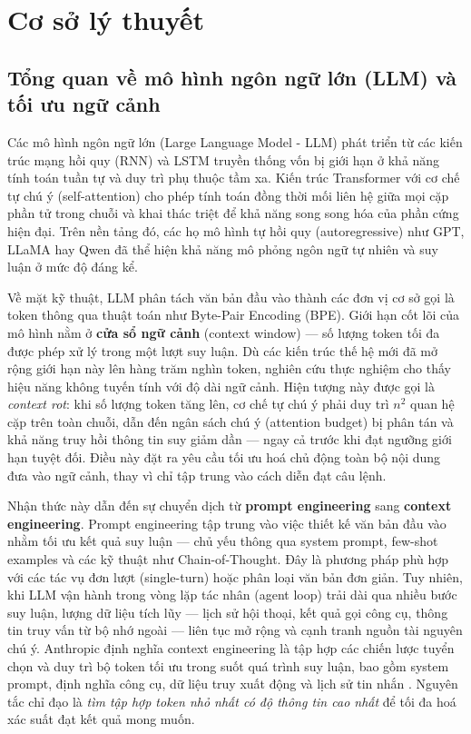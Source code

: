 \chapter{Cơ sở lý thuyết}
\label{chap:theory}

\section{Tổng quan về mô hình ngôn ngữ lớn (LLM) và tối ưu ngữ cảnh}

Các mô hình ngôn ngữ lớn (Large Language Model - LLM) phát triển từ các kiến trúc mạng hồi quy (RNN) và LSTM truyền thống vốn bị giới hạn ở khả năng tính toán tuần tự và duy trì phụ thuộc tầm xa. Kiến trúc Transformer với cơ chế tự chú ý (self-attention) cho phép tính toán đồng thời mối liên hệ giữa mọi cặp phần tử trong chuỗi và khai thác triệt để khả năng song song hóa của phần cứng hiện đại. Trên nền tảng đó, các họ mô hình tự hồi quy (autoregressive) như GPT, LLaMA hay Qwen đã thể hiện khả năng mô phỏng ngôn ngữ tự nhiên và suy luận ở mức độ đáng kể.

Về mặt kỹ thuật, LLM phân tách văn bản đầu vào thành các đơn vị cơ sở gọi là token thông qua thuật toán như Byte-Pair Encoding (BPE). Giới hạn cốt lõi của mô hình nằm ở \textbf{cửa sổ ngữ cảnh} (context window) — số lượng token tối đa được phép xử lý trong một lượt suy luận. Dù các kiến trúc thế hệ mới đã mở rộng giới hạn này lên hàng trăm nghìn token, nghiên cứu thực nghiệm cho thấy hiệu năng không tuyến tính với độ dài ngữ cảnh. Hiện tượng này được gọi là \textit{context rot}: khi số lượng token tăng lên, cơ chế tự chú ý phải duy trì $n^2$ quan hệ cặp trên toàn chuỗi, dẫn đến ngân sách chú ý (attention budget) bị phân tán và khả năng truy hồi thông tin suy giảm dần — ngay cả trước khi đạt ngưỡng giới hạn tuyệt đối. Điều này đặt ra yêu cầu tối ưu hoá chủ động toàn bộ nội dung đưa vào ngữ cảnh, thay vì chỉ tập trung vào cách diễn đạt câu lệnh.

Nhận thức này dẫn đến sự chuyển dịch từ \textbf{prompt engineering} sang \textbf{context engineering}. Prompt engineering tập trung vào việc thiết kế văn bản đầu vào nhằm tối ưu kết quả suy luận — chủ yếu thông qua system prompt, few-shot examples và các kỹ thuật như Chain-of-Thought. Đây là phương pháp phù hợp với các tác vụ đơn lượt (single-turn) hoặc phân loại văn bản đơn giản. Tuy nhiên, khi LLM vận hành trong vòng lặp tác nhân (agent loop) trải dài qua nhiều bước suy luận, lượng dữ liệu tích lũy — lịch sử hội thoại, kết quả gọi công cụ, thông tin truy vấn từ bộ nhớ ngoài — liên tục mở rộng và cạnh tranh nguồn tài nguyên chú ý. Anthropic định nghĩa context engineering là tập hợp các chiến lược tuyển chọn và duy trì bộ token tối ưu trong suốt quá trình suy luận, bao gồm system prompt, định nghĩa công cụ, dữ liệu truy xuất động và lịch sử tin nhắn \cite{anthropic2025contextengineering}. Nguyên tắc chỉ đạo là \textit{tìm tập hợp token nhỏ nhất có độ thông tin cao nhất} để tối đa hoá xác suất đạt kết quả mong muốn.

